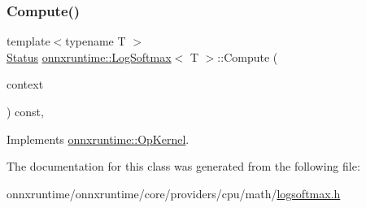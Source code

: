 \subsubsection{\texorpdfstring{Compute()}{Compute()}\hspace{0.1cm}{\footnotesize\ttfamily [2/2]}}
{\footnotesize\ttfamily template$<$typename T $>$ \\
\mbox{\hyperlink{classonnxruntime_1_1common_1_1Status}{Status}} \mbox{\hyperlink{classonnxruntime_1_1LogSoftmax}{onnxruntime\+::\+Log\+Softmax}}$<$ T $>$\+::Compute (\begin{DoxyParamCaption}\item[{\mbox{\hyperlink{classonnxruntime_1_1OpKernelContext}{Op\+Kernel\+Context}} $\ast$}]{context }\end{DoxyParamCaption}) const\hspace{0.3cm}{\ttfamily [override]}, {\ttfamily [virtual]}}



Implements \mbox{\hyperlink{classonnxruntime_1_1OpKernel_a9eca8656a78b1b3ab9d3351a12798650}{onnxruntime\+::\+Op\+Kernel}}.



The documentation for this class was generated from the following file\+:\begin{DoxyCompactItemize}
\item 
onnxruntime/onnxruntime/core/providers/cpu/math/\mbox{\hyperlink{logsoftmax_8h}{logsoftmax.\+h}}\end{DoxyCompactItemize}
